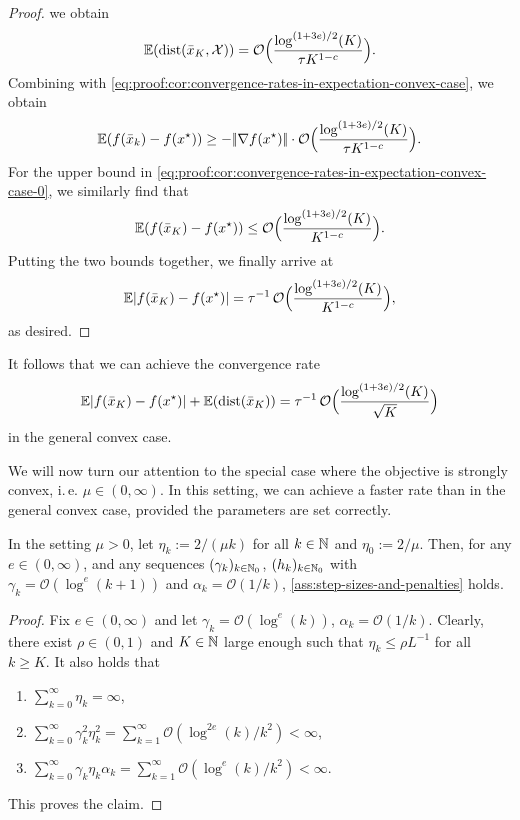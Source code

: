 \begin{proof}
    we obtain
    \[
        \mathbb{E}(\operatorname{dist}(\bar{x}_K, \mathcal{X}))
        = \mathcal{O}\Big( \frac{\log^{(1 + 3e) / 2} (K)}{\tau K^{1-c}} \Big).
    \]
    Combining with \eqref{eq:proof:cor:convergence-rates-in-expectation-convex-case}, we obtain
    \[
        \mathbb{E}( f(\bar{x}_k) - f(x^\star) )
        \geq - |\!|\nabla f(x^\star)|\!| \cdot \mathcal{O}\Big( \frac{\log^{(1 + 3e) / 2} (K)}{\tau K^{1-c}} \Big).
    \]
    For the upper bound in
    \eqref{eq:proof:cor:convergence-rates-in-expectation-convex-case-0}, we
    similarly find that
    \[
        \mathbb{E}(f(\bar{x}_{K}) - f(x^\star))
        \leq
        \mathcal{O}\Big( \frac{\log^{(1 + 3e) / 2} (K)}{K^{1-c}} \Big).
    \]
    Putting the two bounds together, we finally arrive at
    \[
        \mathbb{E}| f(\bar{x}_{K}) - f(x^\star) |
        = \tau^{-1} \, \mathcal{O}\Big( \frac{\log^{(1 + 3e) / 2} (K)}{K^{1-c}} \Big),
    \]
    as desired.
\end{proof}

It follows that we can achieve the convergence rate
\[
    \mathbb{E}| f(\bar{x}_{K}) - f(x^\star) | + \mathbb{E}(\operatorname{dist}(\bar{x}_K)) = \tau^{-1} \, \mathcal{O}\Big( \frac{\log^{(1 + 3e) / 2} (K)}{\sqrt{K}} \Big)
\]
in the general convex case.

We will now turn our attention to the special case where the objective is strongly convex, i.\,e. $\mu \in (0,\infty)$.
In this setting, we can achieve a faster rate than in the general convex case, provided the parameters are set correctly.

\begin{lemma}
    \label{lem:parameters-for-strongly-convex-case}
    In the setting $\mu > 0$,
    let $\eta_k := 2/(\mu k)$ for all $k\in\mathbb{N}$ and $\eta_0 := 2/\mu$. Then,
    for any $e\in(0,\infty)$, and any sequences $(\gamma_k)_{k\in\mathbb{N}_0}$,
    $(h_k)_{k\in\mathbb{N}_0}$
    with $\gamma_k = \mathcal{O}(\log^{e}(k+1))$ and
    $\alpha_k = \mathcal{O}(1/k)$,
    \cref{ass:step-sizes-and-penalties} holds.
\end{lemma}
\begin{proof}
    Fix $e\in (0,\infty)$ and let $\gamma_k = \mathcal{O}(\log^{e}(k))$,
    $\alpha_k = \mathcal{O}(1/k)$.
    Clearly, there exist $\rho\in(0,1)$ and $K\in\mathbb{N}$ large enough
    such that $\eta_k \leq \rho L^{-1}$ for all $k \geq K$. It also holds that
    \begin{enumerate}
        \item $\sum_{k=0}^\infty \eta_k = \infty$,
        \item $\sum_{k=0}^\infty \gamma_k^2 \eta_k^2 = \sum_{k=1}^{\infty} \mathcal{O}(\log^{2e}(k)/k^2) < \infty$,
        \item $\sum_{k=0}^\infty \gamma_k \eta_k \alpha_k = \sum_{k=1}^{\infty} \mathcal{O}(\log^e(k)/k^2) < \infty$.
    \end{enumerate}
    This proves the claim.
\end{proof}

